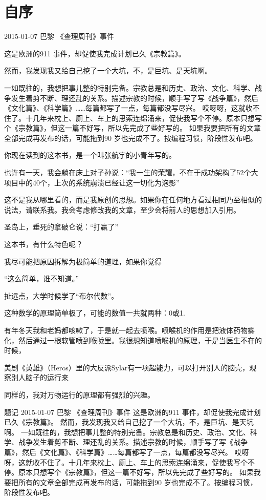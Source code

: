 \chapter*{自序}

2015-01-07 巴黎 《查理周刊》事件

这是欧洲的911 事件，却促使我完成计划已久《宗教篇》。

然而，我发现我又给自己挖了一个大坑，不，是巨坑、是天坑啊。

一如既往的，我想把事儿整的特别完备。宗教总是和历史、政治、文化、科学、战争发生着剪不断、理还乱的关系。描述宗教的时候，顺手写了写《战争篇》，然后《文化篇》、《科学篇》……每篇都写了一点，每篇都没写尽兴。
	哎呀呀，这就收不住了。十几年来枕上、厕上、车上的思索连绵涌来，促使我写个不停。原本只想写个《宗教篇》，但这一篇不好写，所以先完成了些好写的。
	如果我要把所有的文章全部完成再发布的话，可能拖到90 岁也完成不了。按编程习惯，阶段性发布吧。

你现在读到的这本书，是一个叫张航宇的小青年写的。

也许有一天，我会躺在床上对子孙说：“我一生的荣耀，不在于成功架构了52个大项目中的40个，上次的系统崩溃已经让这一切化为泡影”

这不是我从哪里看的，而是我原创的思想。如果你在任何地方看过相同乃至相似的说法，请联系我。我会考虑修改我的文章，至少会将前人的思想加入引用。

圣岛上，垂死的拿破仑说：“打赢了”

这本书，有什么特色呢？

我尽可能把原因拆解为极简单的道理，如果你觉得

“这么简单，谁不知道。”

扯远点，大学时候学了“布尔代数”。

这种数学的原理简单极了，可能的数值一共就两种：0或1.

有年冬天我和老妈都咳嗽了，于是就一起去喷喉。喷喉机的作用是把液体药物雾化，然后通过一根软管喷到喉咙里。我很想知道喷喉机的原理，于是当医生不在的时候，

美剧《英雄》（Heros）里的大反派Sylar有一项超能力，可以打开别人的脑壳，观察别人脑子的运行来

同样的，我对万物运行的原理都有强烈的兴趣。

题记
2015-01-07 巴黎 《查理周刊》事件
	这是欧洲的911 事件，却促使我完成计划已久《宗教篇》。
	然而，我发现我又给自己挖了一个大坑，不，是巨坑、是天坑啊。
	一如既往的，我想把事儿整的特别完备。宗教总是和历史、政治、文化、科学、战争发生着剪不断、理还乱的关系。描述宗教的时候，顺手写了写《战争篇》，然后《文化篇》、《科学篇》……每篇都写了一点，每篇都没写尽兴。
	哎呀呀，这就收不住了。十几年来枕上、厕上、车上的思索连绵涌来，促使我写个不停。原本只想写个《宗教篇》，但这一篇不好写，所以先完成了些好写的。
	如果我要把所有的文章全部完成再发布的话，可能拖到90 岁也完成不了。按编程习惯，阶段性发布吧。

